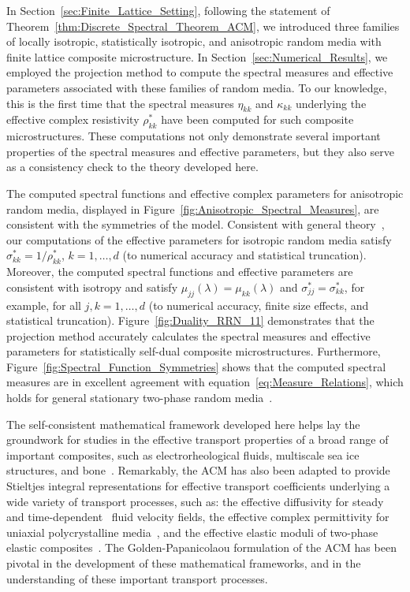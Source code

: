 \documentclass{cmslatex}
\begin{document}
In Section~\ref{sec:Finite_Lattice_Setting}, following the statement
of Theorem~\ref{thm:Discrete_Spectral_Theorem_ACM}, we introduced three 
families of locally isotropic, statistically isotropic, and
anisotropic random media with finite lattice composite
microstructure. In Section~\ref{sec:Numerical_Results}, we employed the
projection method to compute the spectral measures and effective
parameters associated with these families of random media. To our
knowledge, this is the first time that the spectral measures $\eta_{kk}$
and $\kappa_{kk}$ underlying the effective complex resistivity $\rho^*_{kk}$
have been computed for such composite microstructures. These
computations not only demonstrate several important properties of the
spectral measures and effective parameters, but they also serve as a
consistency check to the theory developed here. 



The computed spectral functions and effective complex parameters for
anisotropic random media, displayed in
Figure~\ref{fig:Anisotropic_Spectral_Measures},  are consistent with
the symmetries of the model. Consistent with general
theory~\cite{MILTON:2002:TC}, our computations of the effective
parameters for isotropic random media 
satisfy $\sigma^*_{kk}=1/\rho^*_{kk}$, $k=1,\ldots,d$ (to numerical accuracy and
statistical truncation). Moreover, the computed spectral functions and
effective parameters are consistent with isotropy and satisfy
$\mu_{jj}(\lambda)=\mu_{kk}(\lambda)$ and $\sigma^*_{jj}=\sigma^*_{kk}$, for example, for all
$j,k=1,\ldots,d$ (to numerical accuracy, finite size effects, and
statistical truncation). Figure~\ref{fig:Duality_RRN_11} demonstrates
that the projection method accurately calculates the spectral measures and 
effective parameters for statistically self-dual composite
microstructures. Furthermore,
Figure~\ref{fig:Spectral_Function_Symmetries} shows that the computed  
spectral measures are in excellent agreement with
equation~\eqref{eq:Measure_Relations}, which holds for general
stationary two-phase random media~\cite{Murphy:JMP:063506}. 



The self-consistent mathematical framework developed here helps lay
the groundwork for studies in the effective transport properties of a
broad range of important composites, such as electrorheological
fluids\cite{Murphy:PHD_Thesis}, multiscale sea ice structures, and
bone~\cite{Golden:JBM:337}. Remarkably, the ACM  has also been adapted to
provide Stieltjes integral representations for  effective transport
coefficients underlying a wide variety of transport processes, such
as: the effective diffusivity for
steady~\cite{McLaughlin:SIAM_JAM:780,Avellaneda:CMP-339} and
time-dependent~\cite{Avellaneda:PRE:3249}
fluid velocity fields, the effective complex permittivity for uniaxial
polycrystalline
media~\cite{Barabash:JPCM:10323,Gully_Golden_Polycrystalline}, 
and the effective elastic moduli of two-phase elastic
composites~\cite{Ou:MMAS:655,Ou:2012:411}. The Golden-Papanicolaou
formulation of the ACM has been pivotal in the development of these
mathematical frameworks, and in the understanding of these important
transport processes.  
\end{document}
